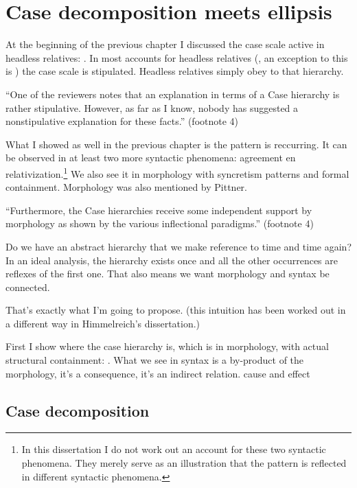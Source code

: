 
\chapter{Case decomposition meets ellipsis}

At the beginning of the previous chapter I discussed the case scale active in headless relatives: . In most accounts for headless relatives (\citealt[cf.][]{pittner1995,vogel2001,grosu2003,harbert1978}, an exception to this is \citealt{himmelreich2017}) the case scale is stipulated. Headless relatives simply obey to that hierarchy.

``One of the reviewers notes that an explanation in terms of a Case hierarchy is rather stipulative. However, as far as I know, nobody has suggested a nonstipulative explanation for these facts.''  (footnote 4)

What I showed as well in the previous chapter is the pattern  is reccurring. It can be observed in at least two more syntactic phenomena: agreement en relativization.\footnote{
In this dissertation I do not work out an account for these two syntactic phenomena. They merely serve as an illustration that the pattern is reflected in different syntactic phenomena.}
We also see it in morphology with syncretism patterns and formal containment. Morphology was also mentioned by Pittner.

``Furthermore, the Case hierarchies receive some independent support by morphology as shown by the various inflectional paradigms.''  (footnote 4)

Do we have an abstract hierarchy that we make reference to time and time again? In an ideal analysis, the hierarchy exists once and all the other occurrences are reflexes of the first one. That also means we want morphology and syntax be connected.

That's exactly what I'm going to propose. (this intuition has been worked out in a different way in Himmelreich's dissertation.)

First I show where the case hierarchy is, which is in morphology, with actual structural containment: . What we see in syntax is a by-product of the morphology, it's a consequence, it's an indirect relation. cause and effect


\section{Case decomposition}

